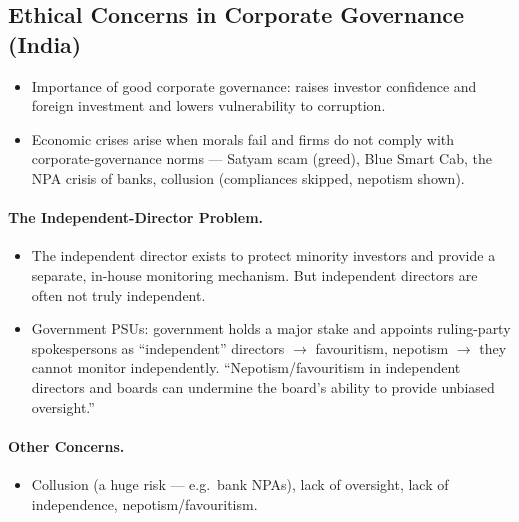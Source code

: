 \subsection{Ethical Concerns in Corporate Governance (India)}
\begin{KeyConcept}
\begin{itemize}
\item Importance of good corporate governance: raises investor confidence and foreign investment and lowers vulnerability to corruption.
\item Economic crises arise when morals fail and firms do not comply with corporate-governance norms --- Satyam scam (greed), Blue Smart Cab, the NPA crisis of banks, collusion (compliances skipped, nepotism shown).
\end{itemize}
\end{KeyConcept}

\paragraph{The Independent-Director Problem.}
\begin{CriticalPoint}
\begin{itemize}
\item The independent director exists to protect minority investors and provide a separate, in-house monitoring mechanism. But independent directors are often not truly independent.
\item Government PSUs: government holds a major stake and appoints ruling-party spokespersons as ``independent'' directors $\rightarrow$ favouritism, nepotism $\rightarrow$ they cannot monitor independently. ``Nepotism/favouritism in independent directors and boards can undermine the board's ability to provide unbiased oversight.''
\end{itemize}
\end{CriticalPoint}

\paragraph{Other Concerns.}
\begin{itemize}
\item Collusion (a huge risk --- e.g.\ bank NPAs), lack of oversight, lack of independence, nepotism/favouritism.
\end{itemize}

